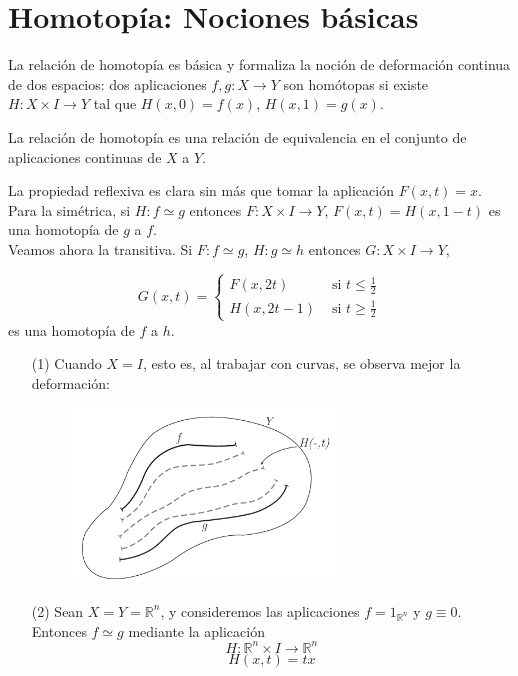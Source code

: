\section{Homotopía: Nociones básicas}
La relación de homotopía es básica y formaliza la noción de deformación continua de dos espacios: dos aplicaciones $f, g : X\rightarrow Y$ son homótopas si existe $H:X\times I \rightarrow Y$ tal que $H(x, 0) = f(x)$, $H(x, 1) = g(x)$. 
\begin{prop}
La relación de homotopía es una relación de equivalencia en el conjunto de aplicaciones continuas de $X$ a $Y$.
\end{prop}
\begin{demo} 
La propiedad reflexiva es clara sin más que tomar la aplicación $F(x,t) = x$.\\
Para la simétrica, si $H : f \simeq g$ entonces $F : X \times I \rightarrow Y$, $F(x, t) = H(x, 1-t)$ es una homotopía de $g$ a $f$.\\
Veamos ahora la transitiva. Si $F : f \simeq g$, $H : g \simeq h$ entonces $G : X \times I \rightarrow Y$,

$$G(x, t) = 
\begin{cases}
	F(x, 2t) 	& 	\text{ si } t \leq \frac{1}{2}\\
	H(x, 2t - 1)& 	\text{ si } t \geq \frac{1}{2}
\end{cases}$$ 
es una homotopía de $f$ a $h$.
\end{demo}
\begin{ejems}
\begin{itemize}
\item[(1)] Cuando $X = I$, esto es, al trabajar con curvas, se observa mejor la deformación:
\begin{figure}[h]
\centering
\includegraphics[width=7cm]{images/pag8.pdf}
\end{figure}
\item[(2)] Sean $X = Y = \mathbb{R}^n$, y consideremos las aplicaciones $f = 1_{\mathbb{R}^n}$ y $g \equiv 0$. Entonces $f \simeq g$ mediante la aplicación
$$H : \mathbb{R}^n \times I \rightarrow \mathbb{R}^n$$ $$H(x, t) = tx$$
\end{itemize}
\end{ejems}
